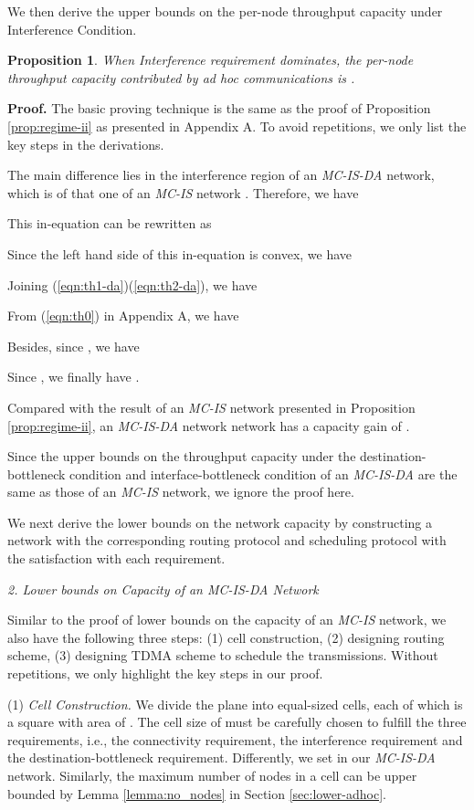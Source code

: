 \documentclass[10pt,journal]{IEEEtran}
\newtheorem{proposition}{Proposition}
\def\done{\hspace*{\fill} }
\begin{document}
We then derive the upper bounds on the per-node throughput capacity under Interference Condition.

\begin{proposition}
\label{prop:regime-ii-DA}
When Interference requirement dominates, the per-node throughput capacity contributed by ad hoc communications is .
\end{proposition}
\textbf{Proof.} 
The basic proving technique is the same as the proof of Proposition \ref{prop:regime-ii} as presented in Appendix A. To avoid repetitions, we only list the key steps in the derivations.

The main difference lies in the interference region of an \emph{MC-IS-DA} network, which is  of that one of an \emph{MC-IS} network \cite{Su:2003}. Therefore, we have 


This in-equation can be rewritten as


Since the left hand side of this in-equation is convex, we have


Joining (\ref{eqn:th1-da})(\ref{eqn:th2-da}), we have


From (\ref{eqn:th0}) in Appendix A, we have


Besides, since , we have


Since , we finally have
.

Compared with the result of an \emph{MC-IS} network presented in Proposition \ref{prop:regime-ii}, an \emph{MC-IS-DA} network network has a capacity gain of . 
\done

Since the upper bounds on the throughput capacity under the destination-bottleneck condition and interface-bottleneck condition of an \emph{MC-IS-DA} are the same as those of an \emph{MC-IS} network, we ignore the proof here.
 
We next derive the lower bounds on the network capacity by constructing a network with the corresponding routing protocol and scheduling protocol with the satisfaction with each requirement. 

\emph{2. Lower bounds on Capacity of an MC-IS-DA Network}

Similar to the proof of lower bounds on the capacity of an \emph{MC-IS} network, we also have the following three steps: (1) cell construction, (2) designing routing scheme, (3) designing TDMA scheme to schedule the transmissions. Without repetitions, we only highlight the key steps in our proof.

(1) \emph{Cell Construction.} We divide the plane into  equal-sized cells, each of which is a square with area of . The cell size of  must be carefully chosen to fulfill the three requirements, i.e., the connectivity requirement, the interference requirement and the destination-bottleneck requirement. Differently,  we set  in our \emph{MC-IS-DA} network. Similarly, the maximum number of nodes in a cell can be upper bounded by Lemma \ref{lemma:no_nodes} in Section \ref{sec:lower-adhoc}.
\end{document}
